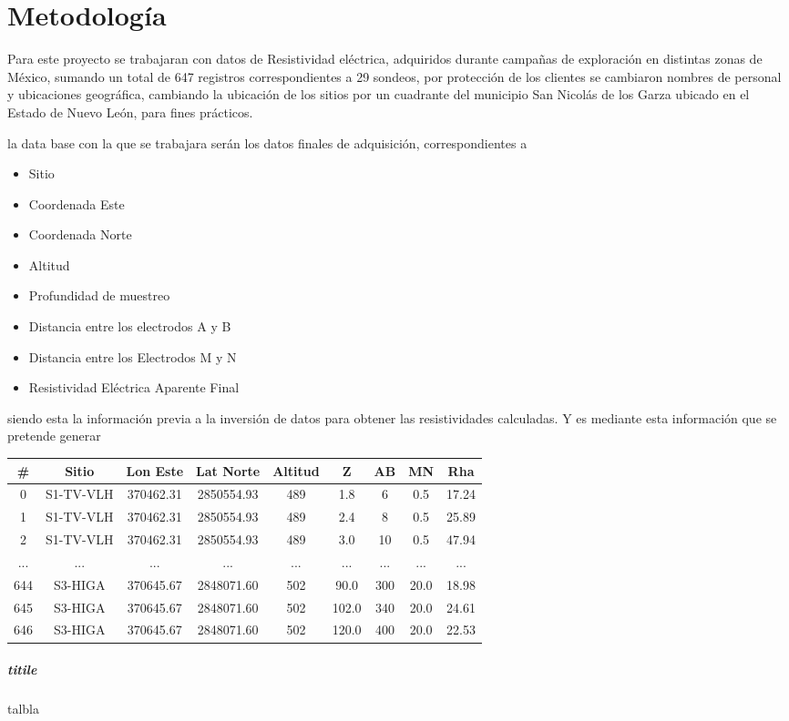 \documentclass[sn-mathphys,Numbered]{sn-jnl}%
\theoremstyle{thmstyleone}%
\theoremstyle{thmstyletwo}%
\theoremstyle{thmstylethree}%
\begin{document}
\section{Metodología}\label{sec3}
Para este proyecto se trabajaran con datos de Resistividad eléctrica, adquiridos durante campañas de exploración en distintas zonas de México, sumando un total de 647 registros correspondientes a 29 sondeos, por protección de los clientes se cambiaron nombres de personal y ubicaciones geográfica, cambiando la ubicación de los sitios por un cuadrante del municipio San Nicolás de los Garza ubicado en el Estado de Nuevo León, para fines prácticos.

la data base con la que se trabajara serán los datos finales de adquisición, correspondientes a 

\begin{itemize} 
	\item  Sitio
	\item  Coordenada Este
	\item  Coordenada Norte
	\item  Altitud 
	\item  Profundidad de muestreo
	\item  Distancia entre los electrodos A y B
	\item  Distancia entre los Electrodos M y N
	\item  Resistividad Eléctrica Aparente Final
\end{itemize}
siendo esta la información previa a la inversión de datos para obtener las resistividades calculadas. Y es mediante esta información que se pretende generar 

\begin{center}
	\begin{tabular}{|c|c|c|c|c|c|c|c|c|}
		\hline
		\#&Sitio & Lon Este & Lat Norte & Altitud & Z & AB & MN & Rha \\
		\hline
		0&S1-TV-VLH&	370462.31&	2850554.93&	489&	1.8&	6&	0.5&	17.24\\	
		1&S1-TV-VLH&	370462.31&	2850554.93&	489&	2.4&	8&	0.5&	25.89\\
		2&S1-TV-VLH&	370462.31&	2850554.93&	489&	3.0&	10&	0.5&	47.94 \\
		...& ... &...  &...  &...  &...  &...  &...  &...  \\
		644&	S3-HIGA&	370645.67&	2848071.60&	502&	90.0&	300&	20.0&	18.98  \\
		645&	S3-HIGA&	370645.67&	2848071.60&	502&	102.0&	340&	20.0&	24.61 \\
		646&	S3-HIGA&	370645.67&	2848071.60&	502&	120.0&	400&	20.0&	22.53 \\
		\hline
	\end{tabular}
	\subparagraph{titile}talbla
\end{center}
\end{document}
